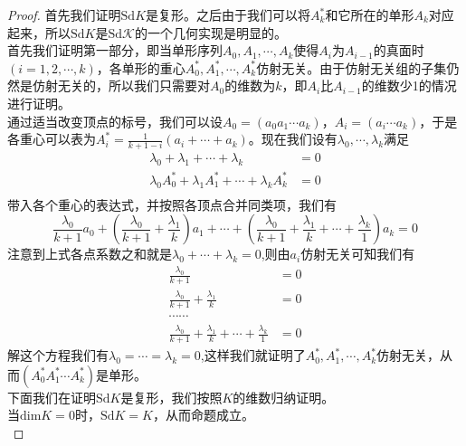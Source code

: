 \begin{proof}
首先我们证明$\text{Sd}K$是复形。之后由于我们可以将$A^{*}_{k}$和它所在的单形$A_{k}$对应起来，所以$\text{Sd}K$是$\text{Sd}\mathcal{K}$的一个几何实现是明显的。\\
首先我们证明第一部分，即当单形序列$A_{0},A_{1},\cdots,A_{k}$使得$A_{i}$为$A_{i-1}$的真面时$(i=1,2,\cdots,k)$，各单形的重心$A^{*}_{0},A^{*}_{1},\cdots,A^{*}_{k}$仿射无关。由于仿射无关组的子集仍然是仿射无关的，所以我们只需要对$A_{0}$的维数为$k$，即$A_{i}$比$A_{i-1}$的维数少1的情况进行证明。\\
通过适当改变顶点的标号，我们可以设$A_{0}=(a_{0}a_{1}\cdots a_{k})$，$A_{i}=(a_{i}\cdots a_{k})$，于是各重心可以表为$A^{*}_{i}=\frac{1}{k+1-i}\left(a_{i}+\cdots+a_{k}\right)$。现在我们设有$\lambda_{0},\cdots,\lambda_{k}$满足
\begin{equation*}
    \begin{aligned}
    \lambda_{0}+\lambda_{1}+\cdots+\lambda_{k}&=0\\
    \lambda_{0}A^{*}_{0}+\lambda_{1}A^{*}_{1}+\cdots+\lambda_{k}A^{*}_{k}&=0\\
    \end{aligned}
\end{equation*}
带入各个重心的表达式，并按照各顶点合并同类项，我们有
\begin{equation}\label{eq1216}
    \frac{\lambda_{0}}{k+1}a_{0}+\left(\frac{\lambda_{0}}{k+1}+\frac{\lambda_{1}}{k}\right)a_{1}+\cdots+\left(\frac{\lambda_{0}}{k+1}+\frac{\lambda_{1}}{k}+\cdots+\frac{\lambda_{k}}{1}\right)a_{k}=0
\end{equation}
注意到上式各点系数之和就是$\lambda_{0}+\cdots+\lambda_{k}=0$,则由$a_{i}$仿射无关可知我们有
\begin{equation*}
    \begin{aligned}
     \frac{\lambda_{0}}{k+1}&=0\\
     \frac{\lambda_{0}}{k+1}+\frac{\lambda_{1}}{k}&=0\\
     \cdots \cdots\\
     \frac{\lambda_{0}}{k+1}+\frac{\lambda_{1}}{k}+\cdots+\frac{\lambda_{k}}{1}&=0
    \end{aligned}
\end{equation*}
解这个方程我们有$\lambda_{0}=\cdots=\lambda_{k}=0$,这样我们就证明了$A^{*}_{0},A^{*}_{1},\cdots,A^{*}_{k}$仿射无关，从而$(A^{*}_{0}A^{*}_{1}\cdots A^{*}_{k})$是单形。\\
下面我们在证明$\text{Sd}K$是复形，我们按照$K$的维数归纳证明。\\
当$\text{dim}K=0$时，$\text{Sd}K=K$，从而命题成立。\\

\end{proof}
